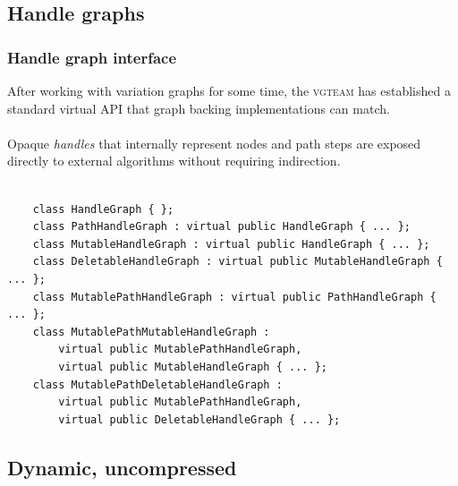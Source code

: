 \documentclass{beamer}
\begin{document}
\subsection{Handle graphs}
\begin{frame}[fragile]
  \frametitle{Handle graph interface}
  After working with variation graphs for some time, the \textsc{vgteam} has established a standard virtual API that graph backing implementations can match.
  \\~\\
  Opaque \emph{handles} that internally represent nodes and path steps are exposed directly to external algorithms without requiring indirection.
  \\~\\
  \begin{lstlisting}
    class HandleGraph { };
    class PathHandleGraph : virtual public HandleGraph { ... };
    class MutableHandleGraph : virtual public HandleGraph { ... };
    class DeletableHandleGraph : virtual public MutableHandleGraph { ... };
    class MutablePathHandleGraph : virtual public PathHandleGraph { ... };
    class MutablePathMutableHandleGraph :
        virtual public MutablePathHandleGraph,
        virtual public MutableHandleGraph { ... };
    class MutablePathDeletableHandleGraph :
        virtual public MutablePathHandleGraph,
        virtual public DeletableHandleGraph { ... };
  \end{lstlisting}
\end{frame}

\subsection{Dynamic, uncompressed}
\end{document}

